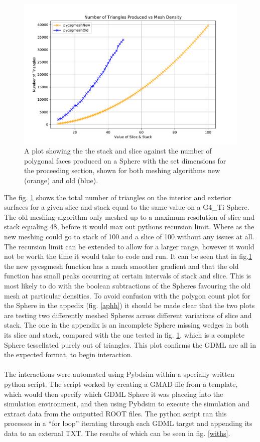 \documentclass[12pt,a4paper]{article}
\begin{document}
\begin{figure}[h!]
\centering
\includegraphics[height=.4\linewidth]{Images//Triangles//MeshvTRi1.pdf}
\caption[width=\columnwidth]{A plot showing the the stack and slice against the number of polygonal faces produced on a Sphere with the set dimensions for the proceeding section, shown for both meshing algorithms new (orange) and old (blue).}
\label{tritri}
\end{figure}
\noindent The fig. \ref{tritri} shows the total number of triangles on the interior and exterior surfaces for a given slice and stack equal to the same value on a G4\_Ti Sphere. The old meshing algorithm only meshed up to a maximum resolution of slice and stack equaling 48, before it would max out pythons recursion limit. Where as the new meshing could go to stack of 100 and a slice of 100 without any issues at all. The recursion limit can be extended to allow for a larger range, however it would not be worth the time it would take to code and run. 
 It can be seen that in fig.\ref{tritri} the new pycsgmesh function has a much smoother gradient and that the old function has small peaks occurring at certain intervals of stack and slice. This is most likely to do with the boolean subtractions of the Spheres favouring the old mesh at particular densities. To avoid confusion with the polygon count plot for the Sphere in the appedix (fig. \ref{aphh}) it should be made clear that the two plots are testing two differently meshed Spheres across different variations of slice and stack. The one in the appendix is an incomplete Sphere missing wedges in both its slice and stack, compared with the one tested in fig. \ref{tritri}, which is a complete Sphere tessellated purely out of triangles.  This plot confirms the GDML are all in the expected format, to begin interaction.
 \\\\
\noindent The interactions were automated using Pybdsim within a specially written python script. The script worked by creating a GMAD file from a template, which would then specify which GDML Sphere it was placeing into the simulation environment, and then using Pybdsim to execute the simulation and extract data from the outputted ROOT files. The python script ran this processes in a ``for loop'' iterating through each GDML target and appending its data to an external TXT. The results of which can be seen in fig. \ref{withs}.
\end{document}
